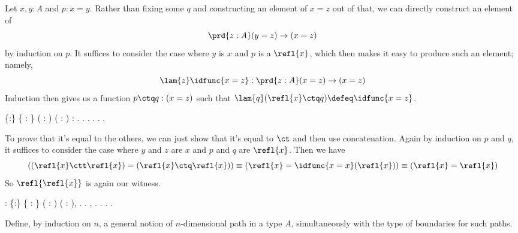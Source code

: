  \soln
Let $x, y : A$ and $p : x = y$.  Rather than fixing some $q$ and
constructing an element of $x = z$ out of that, we can directly
construct an element of
\[
  \prd{z:A} (y = z) \to (x = z)
\]
by induction on $p$.  It suffices to consider the case where $y$ is
$x$ and $p$ is a $\refl{x}$, which then makes it easy to produce such
an element; namely,
\[
  \lam{z}\idfunc{x=z} : \prd{z:A} (x = z) \to (x = z)
\]
Induction then gives us a function $p \ctq q : (x = z)$ such that
$\lam{q}(\refl{x} \ctq q) \defeq \idfunc{x=z}$.
\begin{coqdoccode}
\coqdocemptyline
\coqdocnoindent
{}  \{:\} \{   : \} ( :  \coqdocnotation{=} ) ( :  \coqdocnotation{=} ) :  \coqdocnotation{=} .\coqdoceol
\coqdocindent{1.00em}
 .  .\coqdoceol
\coqdocindent{1.00em}
 . .\coqdoceol
\coqdocnoindent
{}.\coqdoceol
\coqdocemptyline
\end{coqdoccode}
To prove that it's equal to the others, we can just show that it's
equal to $\ct$ and then use concatenation.  Again by induction on $p$
and $q$, it suffices to consider the case where $y$ and $z$ are $x$
and $p$ and $q$ are $\refl{x}$.  Then we have
\[
  \left((\refl{x} \ctt \refl{x}) = (\refl{x} \ctq \refl{x})\right)
  \equiv
  \left(\refl{x} = \idfunc{x=x}(\refl{x})\right)
  \equiv
  \left(\refl{x} = \refl{x}\right)
\] 
So $\refl{\refl{x}}$ is again our witness.\begin{coqdoccode}
\coqdocemptyline
\coqdocnoindent
{}  : \coqdockw{\ensuremath{\forall}} \{:\} \{   : \} ( :  \coqdocnotation{=} ) ( :  \coqdocnotation{=} ),\coqdoceol
\coqdocindent{1.00em}
\coqdocnotation{(}  \coqdocnotation{)} \coqdocnotation{=} \coqdocnotation{(}  \coqdocnotation{)}.\coqdoceol
\coqdocnoindent
{}.\coqdoceol
\coqdocindent{1.00em}
 , . .\coqdoceol
\coqdocnoindent
{}.\coqdoceol
\coqdocemptyline
\coqdocnoindent
{} .\coqdoceol
\coqdocemptyline
\end{coqdoccode}
Define, by induction on $n$, a general notion of $n$-dimensional path
in a type $A$, simultaneously with the type of boundaries for such paths. 


